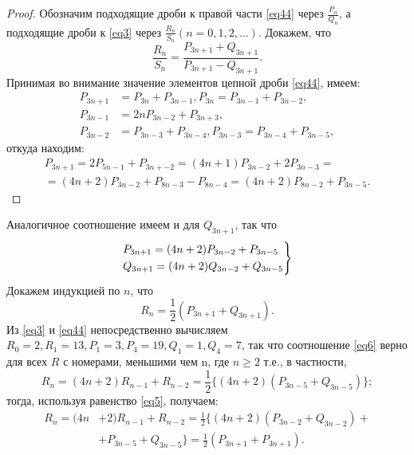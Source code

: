 \documentclass{book}
\begin{document}
\begin{proof}
	Обозначим подходящие дроби к правой части \eqref{eq44} через $\frac{P_{n}}{Q_{n}}$, а подходящие дроби к \eqref{eq3} через $\frac{R_{n}}{S_{n}}(n=0,1,2,\ldots)$. Докажем, что
	\begin{equation*}
		\frac{R_{n}}{S_{n}}=\frac{P_{3n+1}+Q_{3n+1}}{P_{3n+1}-Q_{3n+1}}.
	\end{equation*}
Принимая во внимание значение элементов цепной дроби \eqref{eq44}, имеем: %
\begin{equation*}
	\begin{split}
		P_{3n+1}&=P_{3n}+P_{3n-1},P_{3n}=P_{3n-1}+P_{3n-2},\\
		P_{3n-1}&=2nP_{3n-2}+P_{3n+3},\\
		P_{3n-2}&=P_{3n-3}+P_{3n-4}, P_{3n-3}=P_{3n-4}+P_{3n-5},
	\end{split}
\end{equation*}
откуда находим:
\begin{equation*}
	\begin{split}
		P_{3n+1}=2P_{5n-1}+P_{3n+-2}=(4n+1)P_{3n-2}+2P_{3n-3}=\\
		=(4n+2)P_{3n-2}+P_{8n-3}-P_{8n-4}=(4n+2)P_{8n-2}+P_{3n-5}.
	\end{split}
\end{equation*}
\end{proof}
Аналогичное соотношение имеем и для $Q_{3n+1}$, так что
\begin{equation} \label{eq5}
	\begin{rcases*}
		P_{3n+1}=(4n+2)P_{3n-2}+P_{3n-5} \\
		Q_{3n+1}=(4n+2)Q_{3n-2}+Q_{3n-5}
	\end{rcases*} 
\end{equation}
Докажем индукцией по $n$, что
\begin{equation}\label{eq6}
	R_{n}=\frac{1}{2}(P_{3n+1}+Q_{3n+1}).
\end{equation}
Из \eqref{eq3} и \eqref{eq44} непосредственно вычисляем $R_{0}=2,R_{1}=13,P_{1}=3,P_{4}=19,Q_{1}=1,Q_{4}=7$, так что соотношение \eqref{eq6} верно для всех $R$ с номерами, меньшими чем n, где $n\geqslant2$ т.е., в частности,
\begin{equation*}
R_{n}=(4n+2)R_{n-1}+R_{n-2}=\frac{1}{2}\{(4n+2)(P_{3n-5}+Q_{3n-5}) \};
\end{equation*}
тогда, используя равенство \eqref{eq5}, получаем:
\begin{equation*}
	\begin{split}
		R_{n}=(4n&+2)R_{n-1}+R_{n-2}=\frac{1}{2}\{(4n+2)(P_{3n-2}+Q_{3n-2})+
		\\&+P_{3n-5}+Q_{3n-5}\}=\frac{1}{2}(P_{3n+1}+P_{3n+1}).
	\end{split}
\end{equation*}
\end{document}
